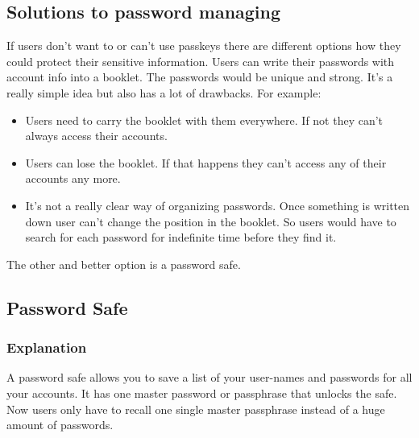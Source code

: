 \documentclass[conference]{IEEEtran}
\begin{document}
\subsection{Solutions to password managing}
If users don't want to or can't use passkeys there are different options how they could protect their sensitive information. Users can write their passwords with account info into a booklet. The passwords would be unique and strong. It's a really simple idea but also has a lot of drawbacks. 
For example:
\begin{itemize}
\item Users need to carry the booklet with them everywhere. If not they can't always access their accounts.
\item Users can lose the booklet. If that happens they can't access any of their accounts any more.
\item It's not a really clear way of organizing passwords. Once something is written down user can't change the position in the booklet. So users would have to search for each password for indefinite time before they find it.
\end{itemize}
The other and better option is a password safe.  

\subsection{Password Safe}
\subsubsection{Explanation}
A password safe allows you to save a list of your user-names and passwords for all your accounts. It has one master password or passphrase that unlocks the safe. Now users only have to recall one single master passphrase instead of a huge amount of passwords.
\end{document}
